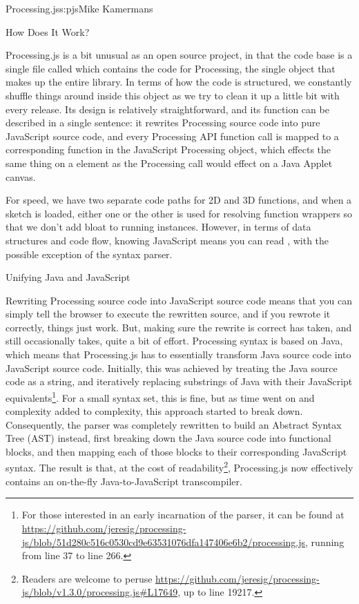 \begin{aosachapter}{Processing.js}{s:pjs}{Mike Kamermans}
\begin{aosasect1}{How Does It Work?}

Processing.js is a bit unusual as an open source project, in that the
code base is a single file called 
which contains the code for Processing, the single object that makes up
the entire library. In terms of how the code is structured, we
constantly shuffle things around inside this object as we try to clean
it up a little bit with every release. Its design is relatively
straightforward, and its function can be described in a single
sentence: it rewrites Processing source code into pure JavaScript
source code, and every Processing API function call is mapped to a
corresponding function in the JavaScript Processing object, which
effects the same thing on a 
element as the Processing call would effect on a Java Applet canvas.

For speed, we have two separate code paths for 2D and 3D functions,
and when a sketch is loaded, either one or the other is used for
resolving function wrappers so that we don't add bloat to running
instances. However, in terms of data structures and code flow, knowing
JavaScript means you can read , with the possible
exception of the syntax parser.

\begin{aosasect2}{Unifying Java and JavaScript}

Rewriting Processing source code into JavaScript source code means
that you can simply tell the browser to execute the rewritten source,
and if you rewrote it correctly, things just work. But, making sure
the rewrite is correct has taken, and still occasionally takes, quite
a bit of effort. Processing syntax is based on Java, which means that
Processing.js has to essentially transform Java source code into
JavaScript source code. Initially, this was achieved by treating the
Java source code as a string, and iteratively replacing substrings of
Java with their JavaScript equivalents\footnote{For those interested
  in an early incarnation of the parser, it can be found at
  \url{https://github.com/jeresig/processing-js/blob/51d280c516c0530cd9e63531076dfa147406e6b2/processing.js},
  running from line 37 to line 266.}. For a small syntax set, this is
fine, but as time went on and complexity added to complexity, this
approach started to break down. Consequently, the parser was
completely rewritten to build an Abstract Syntax Tree (AST) instead, first
breaking down the Java source code into functional blocks, and then
mapping each of those blocks to their corresponding JavaScript
syntax. The result is that, at the cost of
readability\footnote{Readers are welcome to peruse
  \url{https://github.com/jeresig/processing-js/blob/v1.3.0/processing.js\#L17649},
  up to line 19217.}, Processing.js now effectively contains an
on-the-fly Java-to-JavaScript transcompiler.


\end{aosasect2}
\end{aosasect1}
\end{aosachapter}
